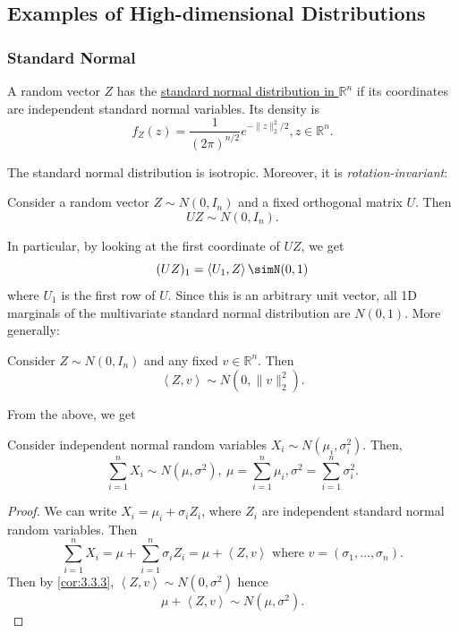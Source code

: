 \subsection{Examples of High-dimensional Distributions}
\subsubsection{Standard Normal}
\begin{definition}[]
\label{def:3.3.1}
A random vector $Z$ has the \underline{standard normal distribution in $\mathbb{R}^n$} if its coordinates 
are independent standard normal variables. Its density is 
\[ f_Z(z) = \frac{1}{(2 \pi)^{n/2}} e^{-\lVert z \rVert_{2}^2 / 2}, z \in \mathbb{R}^n. \]
\end{definition}
The standard normal distribution is isotropic. Moreover, it is \textit{rotation-invariant}:

\begin{proposition}
\label{prop:3.3.2}
Consider a random vector $Z \sim N(0, I_n)$ and a fixed orthogonal matrix $U$. Then 
\[ UZ \sim N(0, I_n). \]
\end{proposition}

In particular, by looking at the first coordinate of $UZ$, we get 
\[ (UZ)_1 = \left\langle U_1, Z \right\rangle \simN(0, 1) \]
where $U_1$ is the first row of $U$. Since this is an arbitrary unit vector, all 1D marginals of the 
multivariate standard normal distribution are $N(0, 1)$. More generally: 

\begin{corollary}[Name]
\label{cor:3.3.3}
Consider $Z \sim N(0, I_n)$ and any fixed $v \in \mathbb{R}^n$. Then 
\[ \left\langle Z, v \right\rangle \sim N(0, \lVert v \rVert_{2}^2). \]
\end{corollary}

From the above, we get 
\begin{corollary}
\label{cor:3.3.4}
Consider independent normal random variables $X_i \sim N(\mu_i, \sigma_i^2)$. Then, 
\[ \sum_{i = 1}^{n} X_i \sim N(\mu, \sigma^2), \ \mu = \sum_{i = 1}^{n}\mu_i, 
\sigma^2 = \sum_{i = 1}^{n} \sigma_i^2. \]
\end{corollary}

\begin{proof}
We can write $X_i = \mu_i + \sigma_i Z_i$, where $Z_i$ are independent standard normal random variables. 
Then 
\[ \sum_{i = 1}^{n} X_i = \mu + \sum_{i = 1}^{n} \sigma_i Z_i = \mu + 
\left\langle Z, v \right\rangle \text{ where } v = (\sigma_1, \dots, \sigma_n). \]
Then by \cref{cor:3.3.3}, $\left\langle Z, v \right\rangle \sim N(0, \sigma^2)$ hence 
\[ \mu + \left\langle Z, v \right\rangle \sim N(\mu, \sigma^2). \]
\end{proof}


